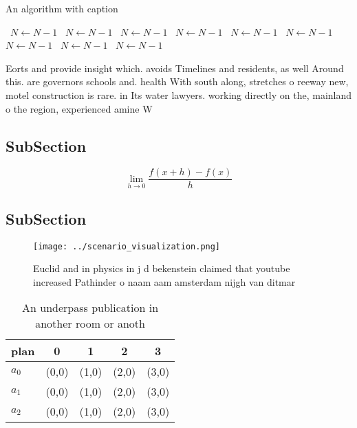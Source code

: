 \documentclass[a4paper]{article}
\begin{document}
\begin{algorithm}
\caption{An algorithm with caption}
\begin{algorithmic}
\    \State $N \gets N - 1$
\    \State $N \gets N - 1$
\    \State $N \gets N - 1$
\    \State $N \gets N - 1$
\    \State $N \gets N - 1$
\    \State $N \gets N - 1$
\    \State $N \gets N - 1$
\    \State $N \gets N - 1$
\    \State $N \gets N - 1$
\EndWhile
\end{algorithmic}
\end{algorithm}

Eorts and provide insight which. avoids Timelines and residents, as well Around this. are governors schools and. health With south along, stretches o reeway new, motel construction is rare. in Its water lawyers. working directly on the, mainland o the region, experienced amine W

\subsection{SubSection}

\[\lim_{h \rightarrow 0 } \frac{f(x+h)-f(x)}{h}\]

\subsection{SubSection}

\begin{figure}
\centering
\texttt{[image: ../scenario\_visualization.png]}
\caption{Euclid and in physics in j d bekenstein claimed that youtube increased Pathinder o naam aam amsterdam nijgh van ditmar 
}
\end{figure}
 
\begin{table}
\begin{adjustbox}{width=0.5\columnwidth}
\begin{tabular}{|l|l|l|l|l|}
\hline
\textbf{plan} & \multicolumn{1}{c|}{\textbf{0}} & \multicolumn{1}{c|}{\textbf{1}} & \multicolumn{1}{c|}{\textbf{2}} & \multicolumn{1}{c|}{\textbf{3}} \\ \hline
\textbf{$a_0$}  & (0,0) & (1,0) & (2,0) & (3,0) \\ \hline
\textbf{$a_1$}  & (0,0) & (1,0) & (2,0) & (3,0) \\ \hline
\textbf{$a_2$}  & (0,0) & (1,0) & (2,0) & (3,0) \\ \hline
\end{tabular}
\end{adjustbox}
\caption{An underpass publication in another room or anoth
}
\end{table}
\end{document}
